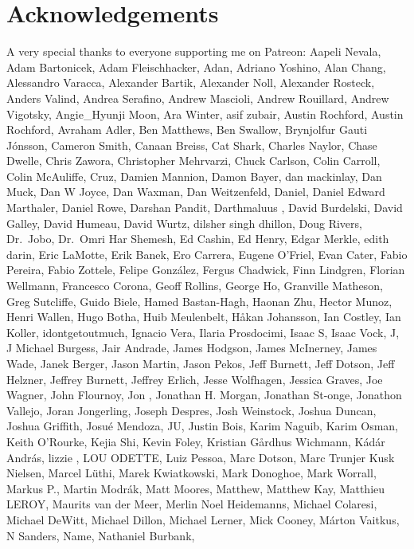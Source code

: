 \documentclass[
  letterpaper,
  DIV=11,
  numbers=noendperiod]{scrartcl}
\begin{document}
\hypertarget{acknowledgements}{%
\section{Acknowledgements}\label{acknowledgements}}

A very special thanks to everyone supporting me on Patreon: Aapeli
Nevala, Adam Bartonicek, Adam Fleischhacker, Adan, Adriano Yoshino, Alan
Chang, Alessandro Varacca, Alexander Bartik, Alexander Noll, Alexander
Rosteck, Anders Valind, Andrea Serafino, Andrew Mascioli, Andrew
Rouillard, Andrew Vigotsky, Angie\_Hyunji Moon, Ara Winter, asif zubair,
Austin Rochford, Austin Rochford, Avraham Adler, Ben Matthews, Ben
Swallow, Brynjolfur Gauti Jónsson, Cameron Smith, Canaan Breiss, Cat
Shark, Charles Naylor, Chase Dwelle, Chris Zawora, Christopher
Mehrvarzi, Chuck Carlson, Colin Carroll, Colin McAuliffe, Cruz, Damien
Mannion, Damon Bayer, dan mackinlay, Dan Muck, Dan W Joyce, Dan Waxman,
Dan Weitzenfeld, Daniel, Daniel Edward Marthaler, Daniel Rowe, Darshan
Pandit, Darthmaluus , David Burdelski, David Galley, David Humeau, David
Wurtz, dilsher singh dhillon, Doug Rivers, Dr.~Jobo, Dr.~Omri Har
Shemesh, Ed Cashin, Ed Henry, Edgar Merkle, edith darin, Eric LaMotte,
Erik Banek, Ero Carrera, Eugene O'Friel, Evan Cater, Fabio Pereira,
Fabio Zottele, Felipe González, Fergus Chadwick, Finn Lindgren, Florian
Wellmann, Francesco Corona, Geoff Rollins, George Ho, Granville
Matheson, Greg Sutcliffe, Guido Biele, Hamed Bastan-Hagh, Haonan Zhu,
Hector Munoz, Henri Wallen, Hugo Botha, Huib Meulenbelt, Håkan
Johansson, Ian Costley, Ian Koller, idontgetoutmuch, Ignacio Vera,
Ilaria Prosdocimi, Isaac S, Isaac Vock, J, J Michael Burgess, Jair
Andrade, James Hodgson, James McInerney, James Wade, Janek Berger, Jason
Martin, Jason Pekos, Jeff Burnett, Jeff Dotson, Jeff Helzner, Jeffrey
Burnett, Jeffrey Erlich, Jesse Wolfhagen, Jessica Graves, Joe Wagner,
John Flournoy, Jon , Jonathan H. Morgan, Jonathan St-onge, Jonathon
Vallejo, Joran Jongerling, Joseph Despres, Josh Weinstock, Joshua
Duncan, Joshua Griffith, Josué Mendoza, JU, Justin Bois, Karim Naguib,
Karim Osman, Keith O'Rourke, Kejia Shi, Kevin Foley, Kristian Gårdhus
Wichmann, Kádár András, lizzie , LOU ODETTE, Luiz Pessoa, Marc Dotson,
Marc Trunjer Kusk Nielsen, Marcel Lüthi, Marek Kwiatkowski, Mark
Donoghoe, Mark Worrall, Markus P., Martin Modrák, Matt Moores, Matthew,
Matthew Kay, Matthieu LEROY, Maurits van der Meer, Merlin Noel
Heidemanns, Michael Colaresi, Michael DeWitt, Michael Dillon, Michael
Lerner, Mick Cooney, Márton Vaitkus, N Sanders, Name, Nathaniel Burbank,
\end{document}
